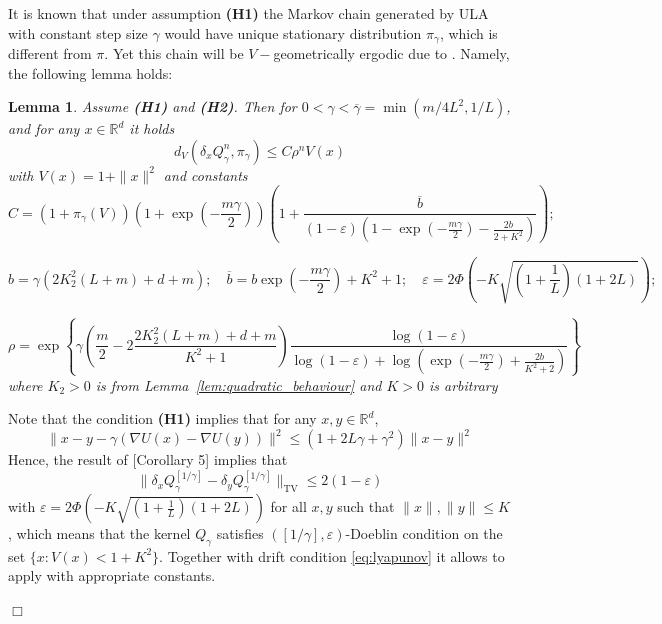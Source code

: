 \documentclass[bj]{imsart}
\def\rset{\mathbb{R}}
\def\rset{\mathbb{R}}
\newcommand{\proofendsign}{$\Box$}
\newtheorem{lem}[thm]{Lemma}
\newenvironment{proof}{{\noindent \bf Proof }}
 {{\hspace*{\fill}\proofendsign\par\bigskip}}
\begin{document}
It is known that under assumption {\bf (H1)} the Markov chain generated by ULA with constant step size $\gamma$ would have unique stationary distribution $\pi_\gamma$, which is different from $\pi$. Yet this chain will be $V-$geometrically ergodic due to \cite[Theorem~19.4.1]{moulines2018}. Namely, the following lemma holds:

\begin{lem}
\label{lem:v_ergodicity}
 Assume  {\bf (H1)} and {\bf (H2)}. Then for $0 < \gamma < \overline{\gamma}= \min(m / 4L^2,1/L)$, and for any $x \in \rset^d$  it holds
$$
d_V(\delta_xQ_{\gamma}^{n},\pi_\gamma) \leq C\rho^{n}V(x)
$$
with $V(x) = 1 + \|x\|^2$ and constants
$$
C = \left(1+\pi_\gamma(V)\right)\left(1 + \exp{\left(-\frac{m\gamma}{2}\right)}\right)\left(1+\frac{\overline{b}}{(1-\varepsilon)(1-\exp{\left(-\frac{m\gamma}{2}\right)} - \frac{2b}{2+K^2})}\right);
$$

$$
b = \gamma\left(2K_2^2(L+m) + d + m\right); \quad \overline{b} = b\exp{\left(-\frac{m\gamma}{2}\right)} + K^2 + 1; \quad \varepsilon = 2\Phi\left(-K\sqrt{\left(1+\frac{1}{L}\right)\left(1 + 2L\right)}\right); \quad
$$

$$
\rho = \exp\left\{\gamma\left(\frac{m}{2} - 2\frac{2K_2^2(L+m) + d + m}{K^2 + 1}\right)\frac{\log{(1-\varepsilon)}}{\log{(1-\varepsilon)} + \log{(\exp{\left(-\frac{m\gamma}{2}\right)} + \frac{2b}{K^2+2})}}\right\}
$$
where $K_2 > 0$ is from Lemma~\ref{lem:quadratic_behaviour} and $K > 0$ is arbitrary
\end{lem}

\begin{proof} Note that the condition {\bf (H1)} implies that for any $x,y \in \rset^d$,
\[
\|x-y-\gamma(\nabla U(x) - \nabla U(y))\|^2 \leq (1 + 2L\gamma + \gamma^2)\|x-y\|^2
\] 
Hence, the result of [Corollary 5]\cite{DurmusBortoli} implies that
\[
\|\delta_xQ^{[1/\gamma]}_{\gamma} - \delta_yQ^{[1/\gamma]}_{\gamma}\|_{\text{TV}} \leq 2(1-\varepsilon)
\]
with $\varepsilon = 2\Phi\left(-K\sqrt{\left(1+\frac{1}{L}\right)\left(1 + 2L\right)}\right)$ for all $x,y$ such that $\|x\|,\|y\| \leq K$, which means that the kernel $Q_{\gamma}$ satisfies $([1/\gamma],\varepsilon)$-Doeblin condition on the set $\{x: V(x) < 1+K^2\}$. Together with drift condition \eqref{eq:lyapunov} it allows to apply \cite[Theorem~19.4.1]{moulines2018} with appropriate constants.
\end{proof}
\end{document}
